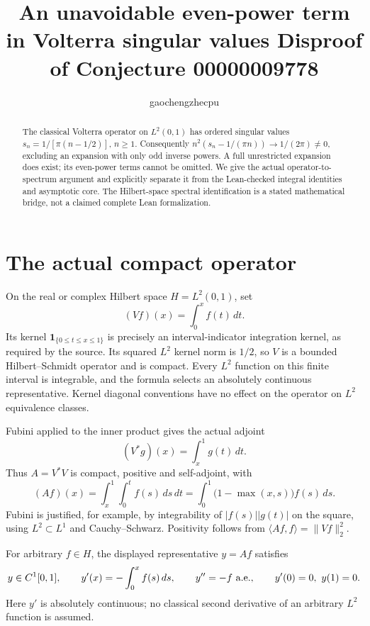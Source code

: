 \documentclass[11pt]{article}
\title{An unavoidable even-power term in Volterra singular values\newline
\large Disproof of Conjecture 00000009778}
\author{gaochengzhecpu}\date{}
\begin{document}
\maketitle
\begin{abstract}
The classical Volterra operator on $L^2(0,1)$ has ordered singular
values $s_n=1/[\pi(n-1/2)]$, $n\geq1$. Consequently
$n^2(s_n-1/(\pi n))\to1/(2\pi)\ne0$, excluding an expansion
with only odd inverse powers. A full unrestricted expansion does
exist; its even-power terms cannot be omitted. We give the
actual operator-to-spectrum argument and explicitly separate it
from the Lean-checked integral identities and asymptotic core.
The Hilbert-space spectral identification is a stated mathematical
bridge, not a claimed complete Lean formalization.
\end{abstract}

\section*{The actual compact operator}
On the real or complex Hilbert space $H=L^2(0,1)$, set
\[
 (Vf)(x)=\int_0^x f(t)\,dt.
\]
Its kernel $\mathbf1_{\{0\leq t\leq x\leq1\}}$ is precisely an
interval-indicator integration kernel, as required by the source.
Its squared $L^2$ kernel norm is $1/2$, so $V$ is a bounded
Hilbert--Schmidt operator and is compact. Every $L^2$ function on
this finite interval is integrable, and the formula selects an
absolutely continuous representative. Kernel diagonal conventions
have no effect on the operator on $L^2$ equivalence classes.

Fubini applied to the inner product gives the actual adjoint
\[
 (V^*g)(x)=\int_x^1 g(t)\,dt.
\]
Thus $A=V^*V$ is compact, positive and self-adjoint, with
\[
 (Af)(x)=\int_x^1\int_0^t f(s)\,ds\,dt
       =\int_0^1\bigl(1-\max(x,s)\bigr)f(s)\,ds.
\]
Fubini is justified, for example, by integrability of
$|f(s)||g(t)|$ on the square, using $L^2\subset L^1$ and
Cauchy--Schwarz. Positivity follows from
$\langle Af,f\rangle=\|Vf\|_2^2$.

For arbitrary $f\in H$, the displayed representative $y=Af$
satisfies
\[
 y\in C^1[0,1],\qquad y'(x)=-\int_0^x f(s)\,ds,
 \qquad y''=-f\ \hbox{a.e.},\qquad y'(0)=0,\ y(1)=0.
\]
Here $y'$ is absolutely continuous; no classical second
derivative of an arbitrary $L^2$ function is assumed.

\newpage
\end{document}
